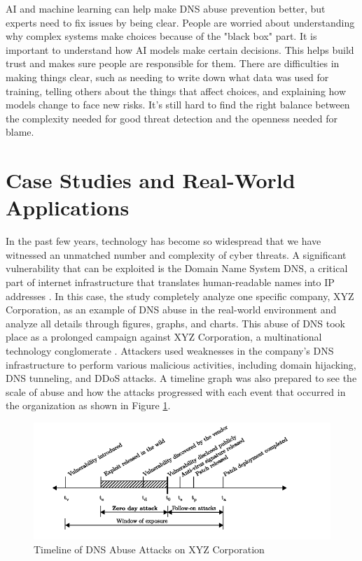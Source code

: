 AI and machine learning can help make DNS abuse prevention better, but experts need to fix issues by being clear. People are worried about understanding why complex systems make choices because of the "black box" part. It is important to understand how AI models make certain decisions. This helps build trust and makes sure people are responsible for them. There are difficulties in making things clear, such as needing to write down what data was used for training, telling others about the things that affect choices, and explaining how models change to face new risks. It's still hard to find the right balance between the complexity needed for good threat detection and the openness needed for blame.

\section{Case Studies and Real-World Applications}

In the past few years, technology has become so widespread that we have witnessed an unmatched number and complexity of cyber threats. A significant vulnerability that can be exploited is the Domain Name System DNS, a critical part of internet infrastructure that translates human-readable names into IP addresses \cite{kumari2021sac115}. In this case, the study completely analyze one specific company, XYZ Corporation, as an example of DNS abuse in the real-world environment and analyze all details through figures, graphs, and charts. This abuse of DNS took place as a prolonged campaign against XYZ Corporation, a multinational technology conglomerate \cite{mohammed2021network}. Attackers used weaknesses in the company's DNS infrastructure to perform various malicious activities, including domain hijacking, DNS tunneling, and DDoS attacks. A timeline graph was also prepared to see the scale of abuse and how the attacks progressed with each event that occurred in the organization as shown in Figure \ref{fig:figureOne}.

\begin{figure}[ht]
\centering
\includegraphics{background/XYZ1.png}
\caption{Timeline of DNS Abuse Attacks on XYZ Corporation}
\label{fig:figureOne}
\end{figure}

